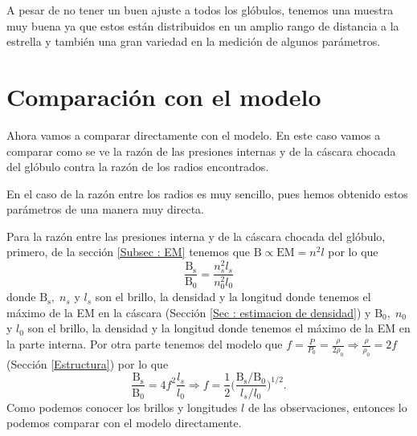 \documentclass{book}
\begin{document}
A pesar de no tener un buen ajuste a todos los glóbulos, tenemos una muestra muy buena ya que estos están distribuidos en un amplio rango de distancia a la estrella y también una gran variedad en la medición de algunos parámetros. 




\section{Comparación con el modelo}

Ahora vamos a comparar directamente con el modelo. En este caso vamos a comparar como se ve la razón de las presiones internas y de la cáscara chocada del glóbulo contra la razón de los radios encontrados. 

En el caso de la razón entre los radios es muy sencillo, pues hemos obtenido estos parámetros de una manera muy directa.

Para la razón entre las presiones interna y de la cáscara chocada del glóbulo, primero, de la sección \ref{Subsec : EM} tenemos que $\mathrm{B}\propto \mathrm{EM}=n^2l$ por lo que
\[\frac{\mathrm{B_s}}{\mathrm{B_0}}=\frac{n_s^2l_s}{n_0^2l_0}\]
donde $\mathrm{B_s}, \; n_s$ y $l_s$ son el brillo, la densidad y la longitud donde tenemos el máximo de la EM en la cáscara (Sección \ref{Sec : estimacion de densidad}) y  $\mathrm{B_0}, \; n_0$ y $l_0$ son el brillo, la densidad y la longitud donde tenemos el máximo de la EM en la parte interna. Por otra parte tenemos del modelo que $f = \frac{P}{P_0}=\frac{\rho}{2\rho_0} \Rightarrow \frac{\rho}{\rho_0}=2f$ (Sección \ref{Estructura}) por lo que
\[\frac{\mathrm{B_s}}{\mathrm{B_0}}=4f^2\frac{l_s}{l_0}\Rightarrow f= \frac{1}{2}\Big(\frac{\mathrm{B_s}/\mathrm{B_0}}{l_s/l_0}\Big)^{1/2}.\]  Como podemos conocer los brillos y longitudes $l$ de las observaciones, entonces lo podemos comparar con el modelo directamente.
\end{document}
